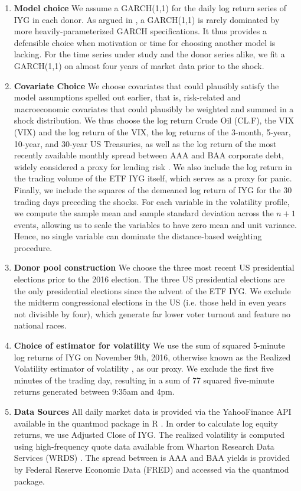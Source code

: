 \documentclass[11pt,3p,review,authoryear]{elsarticle}
\theoremstyle{definition}
\begin{document}
\begin{enumerate}
    \item \textbf{Model choice} We assume a GARCH(1,1) for the daily log return series of IYG in each donor.  As argued in \citet{hansen2005forecast}, a GARCH(1,1) is rarely dominated by more heavily-parameterized GARCH specifications.  It thus provides a defensible choice when motivation or time for choosing another model is lacking.  For the time series under study and the donor series alike, we fit a GARCH(1,1) on almost four years of market data prior to the shock.

    \item \textbf{Covariate Choice} We choose covariates that could plausibly satisfy the model assumptions spelled out earlier, that is, risk-related and macroeconomic covariates that could plausibly be weighted and summed in a shock distribution.  We thus choose the log return Crude Oil (CL.F), the VIX (VIX) and the log return of the VIX, the log returns of the 3-month, 5-year, 10-year, and 30-year US Treasuries, as well as the log return of the most recently available monthly spread between AAA and BAA corporate debt, widely considered a proxy for lending risk \citep{goodell2013us, kane1996p}.  We also include the log return in the trading volume of the ETF IYG itself, which serves as a proxy for panic.  Finally, we include the squares of the demeaned log return of IYG for the 30 trading days preceding the shocks.  For each variable in the volatility profile, we compute the sample mean and sample standard deviation across the $n+1$ events, allowing us to scale the variables to have zero mean and unit variance.  Hence, no single variable can dominate the distance-based weighting procedure.

    \item \textbf{Donor pool construction} We choose the three most recent US presidential elections prior to the 2016 election.  The three US presidential elections are the only presidential elections since the advent of the ETF IYG.  We exclude the midterm congressional elections in the US (i.e. those held in even years not divisible by four), which generate far lower voter turnout and feature no national races.

    \item \textbf{Choice of estimator for volatility} We use the sum of squared 5-minute log returns of IYG on November 9th, 2016, otherwise known as the Realized Volatility estimator of volatility \citep{andersen2008realized}, as our proxy.  We exclude the first five minutes of the trading day, resulting in a sum of 77 squared five-minute returns generated between 9:35am and 4pm.
    \item \textbf{Data Sources} All daily market data is provided via the YahooFinance API available in the quantmod package in R \citep{ryan2015package}.  In order to calculate log equity returns, we use Adjusted Close of IYG.  The realized volatility is computed using high-frequency quote data available from Wharton Research Data Services (WRDS) \citep{wachowicz2020wharton}.  The spread between is AAA and BAA yields is provided by Federal Reserve Economic Data (FRED) and accessed via the quantmod package.
\end{enumerate} 
\end{document}
